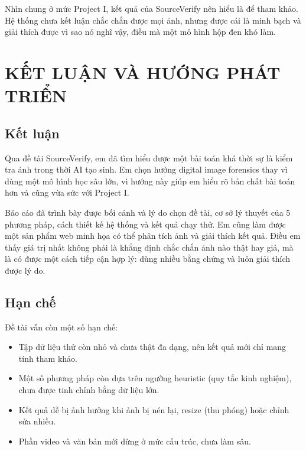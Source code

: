 \documentclass[14pt,a4paper,oneside]{report}
\begin{document}
Nhìn chung ở mức Project I, kết quả của SourceVerify nên hiểu là để tham khảo. Hệ thống chưa kết luận chắc chắn được mọi ảnh, nhưng được cái là minh bạch và giải thích được vì sao nó nghĩ vậy, điều mà một mô hình hộp đen khó làm.

\clearpage

\chapter{KẾT LUẬN VÀ HƯỚNG PHÁT TRIỂN}

\section{Kết luận}
Qua đề tài SourceVerify, em đã tìm hiểu được một bài toán khá thời sự là kiểm tra ảnh trong thời AI tạo sinh. Em chọn hướng digital image forensics thay vì dùng một mô hình học sâu lớn, vì hướng này giúp em hiểu rõ bản chất bài toán hơn và cũng vừa sức với Project I.

Báo cáo đã trình bày được bối cảnh và lý do chọn đề tài, cơ sở lý thuyết của 5 phương pháp, cách thiết kế hệ thống và kết quả chạy thử. Em cũng làm được một sản phẩm web minh họa có thể phân tích ảnh và giải thích kết quả. Điều em thấy giá trị nhất không phải là khẳng định chắc chắn ảnh nào thật hay giả, mà là có được một cách tiếp cận hợp lý: dùng nhiều bằng chứng và luôn giải thích được lý do.

\section{Hạn chế}
Đề tài vẫn còn một số hạn chế:
\begin{itemize}
  \item Tập dữ liệu thử còn nhỏ và chưa thật đa dạng, nên kết quả mới chỉ mang tính tham khảo.
  \item Một số phương pháp còn dựa trên ngưỡng heuristic (quy tắc kinh nghiệm), chưa được tinh chỉnh bằng dữ liệu lớn.
  \item Kết quả dễ bị ảnh hưởng khi ảnh bị nén lại, resize (thu phóng) hoặc chỉnh sửa nhiều.
  \item Phần video và văn bản mới dừng ở mức cấu trúc, chưa làm sâu.
\end{itemize}
\end{document}
